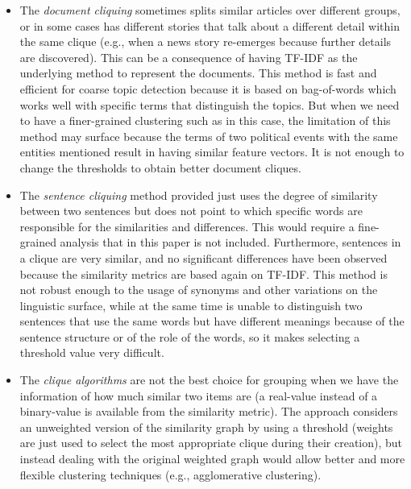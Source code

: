 \begin{itemize}
    \item The \emph{document cliquing}
    sometimes splits similar articles over different groups, or in some cases has different stories that talk about a different detail within the same clique (e.g., when a news story re-emerges because further details are discovered).
    This can be a consequence of having TF-IDF as the underlying method to represent the documents.
    This method is fast and efficient for coarse topic detection because it is based on bag-of-words which works well with specific terms that distinguish the topics.
    But when we need to have a finer-grained clustering such as in this case, the limitation of this method may surface because the terms of two political events with the same entities mentioned result in having similar feature vectors.
    It is not enough to change the thresholds to obtain better document cliques.
    \item The \emph{sentence cliquing} method provided just uses the degree of similarity between two sentences but does not point to which specific words are responsible for the similarities and differences. This would require a fine-grained analysis that in this paper is not included. Furthermore, sentences in a clique are very similar, and no significant differences have been observed because the similarity metrics are based again on TF-IDF. This method is not robust enough to the usage of synonyms and other variations on the linguistic surface, while at the same time is unable to distinguish two sentences that use the same words but have different meanings because of the sentence structure or of the role of the words, so it makes selecting a threshold value very difficult.
    \item The \emph{clique algorithms} are not the best choice for grouping when we have the information of how much similar two items are (a real-value instead of a binary-value is available from the similarity metric). The approach considers an unweighted version of the similarity graph by using a threshold (weights are just used to select the most appropriate clique during their creation), but instead dealing with the original weighted graph would allow better and more flexible clustering techniques (e.g., agglomerative clustering). %
\end{itemize}


